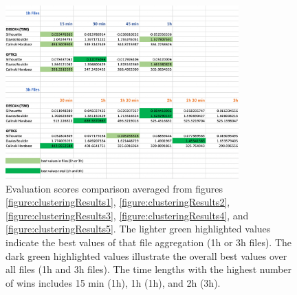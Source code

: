 \begin{figure}
  \centering
  \includegraphics[width=0.8\textwidth]{./images/clusteringResults/clusteringResults6.png}
  \caption{Evaluation scores comparison averaged from figures \ref{figure:clusteringResults1}, \ref{figure:clusteringResults2}, \ref{figure:clusteringResults3}, \ref{figure:clusteringResults4}, and \ref{figure:clusteringResults5}. The lighter green highlighted values indicate the best values of that file aggregation (1h or 3h files). The dark green highlighted values illustrate the overall best values over all files (1h and 3h files). The time lengths with the highest number of wins includes 15 min (1h), 1h (1h), and 2h (3h). }
  \label{figure:clusteringResults6}
\end{figure}


